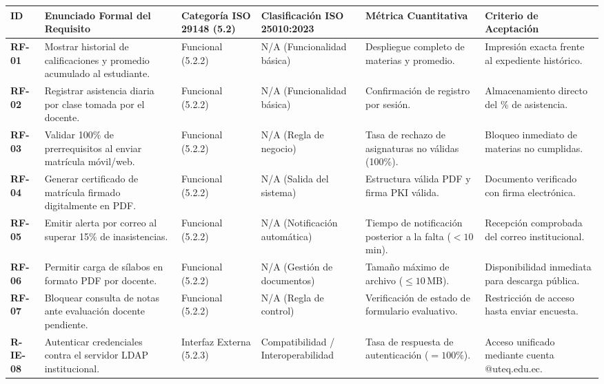 \documentclass[conference]{IEEEtran}
\begin{document}
	\vspace{0.2cm}
	{\centering
		\scriptsize
		\setlength{\tabcolsep}{2.5pt}
		\noindent\begin{tabularx}{\textwidth}{@{}p{0.8cm} Y p{2.1cm} p{2.5cm} p{2.0cm} p{2.1cm}@{}}
			\toprule
			\textbf{ID} & \textbf{Enunciado Formal del Requisito} & \textbf{Categoría ISO 29148 (5.2)} & \textbf{Clasificación ISO 25010:2023} & \textbf{Métrica Cuantitativa} & \textbf{Criterio de Aceptación}\\
			\midrule
			\textbf{RF-01} & Mostrar historial de calificaciones y promedio acumulado al estudiante. & Funcional (5.2.2) & N/A (Funcionalidad básica) & Despliegue completo de materias y promedio. & Impresión exacta frente al expediente histórico.\\
			\addlinespace
			\textbf{RF-02} & Registrar asistencia diaria por clase tomada por el docente. & Funcional (5.2.2) & N/A (Funcionalidad básica) & Confirmación de registro por sesión. & Almacenamiento directo del \% de asistencia.\\
			\addlinespace
			\textbf{RF-03} & Validar 100\% de prerrequisitos al enviar matrícula móvil/web. & Funcional (5.2.2) & N/A (Regla de negocio) & Tasa de rechazo de asignaturas no válidas (100\%). & Bloqueo inmediato de materias no cumplidas.\\
			\addlinespace
			\textbf{RF-04} & Generar certificado de matrícula firmado digitalmente en PDF. & Funcional (5.2.2) & N/A (Salida del sistema) & Estructura válida PDF y firma PKI válida. & Documento verificado con firma electrónica.\\
			\addlinespace
			\textbf{RF-05} & Emitir alerta por correo al superar 15\% de inasistencias. & Funcional (5.2.2) & N/A (Notificación automática) & Tiempo de notificación posterior a la falta ($< 10$\,min). & Recepción comprobada del correo institucional.\\
			\addlinespace
			\textbf{RF-06} & Permitir carga de sílabos en formato PDF por docente. & Funcional (5.2.2) & N/A (Gestión de documentos) & Tamaño máximo de archivo ($\le 10$\,MB). & Disponibilidad inmediata para descarga pública.\\
			\addlinespace
			\textbf{RF-07} & Bloquear consulta de notas ante evaluación docente pendiente. & Funcional (5.2.2) & N/A (Regla de control) & Verificación de estado de formulario evaluativo. & Restricción de acceso hasta enviar encuesta.\\
			\addlinespace
			\textbf{R-IE-08} & Autenticar credenciales contra el servidor LDAP institucional. & Interfaz Externa (5.2.3) & Compatibilidad / Interoperabilidad & Tasa de respuesta de autenticación ($= 100\%$). & Acceso unificado mediante cuenta @uteq.edu.ec.\\

\end{tabularx}}
\end{document}
